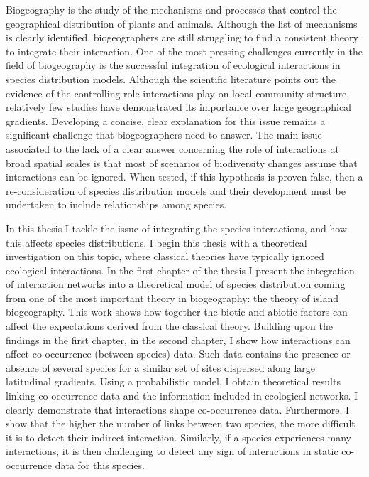 Biogeography is the study of the mechanisms and processes that control
the geographical distribution of plants and animals. Although the list
of mechanisms is clearly identified, biogeographers are still struggling
to find a consistent theory to integrate their interaction. One of the
most pressing challenges currently in the field of biogeography is the
successful integration of ecological interactions in species
distribution models. Although the scientific literature points out the
evidence of the controlling role interactions play on local community
structure, relatively few studies have demonstrated its importance over
large geographical gradients. Developing a concise, clear explanation
for this issue remains a significant challenge that biogeographers need
to answer. The main issue associated to the lack of a clear answer
concerning the role of interactions at broad spatial scales is that most
of scenarios of biodiversity changes assume that interactions can be
ignored. When tested, if this hypothesis is proven false, then a
re-consideration of species distribution models and their development
must be undertaken to include relationships among species.

In this thesis I tackle the issue of integrating the species
interactions, and how this affects species distributions. I begin this
thesis with a theoretical investigation on this topic, where classical
theories have typically ignored ecological interactions. In the first
chapter of the thesis I present the integration of interaction networks
into a theoretical model of species distribution coming from one of the
most important theory in biogeography: the theory of island
biogeography. This work shows how together the biotic and abiotic
factors can affect the expectations derived from the classical theory.
Building upon the findings in the first chapter, in the second chapter,
I show how interactions can affect co-occurrence (between species) data.
Such data contains the presence or absence of several species for a
similar set of sites dispersed along large latitudinal gradients. Using
a probabilistic model, I obtain theoretical results linking
co-occurrence data and the information included in ecological networks.
I clearly demonstrate that interactions shape co-occurrence data.
Furthermore, I show that the higher the number of links between two
species, the more difficult it is to detect their indirect interaction.
Similarly, if a species experiences many interactions, it is then
challenging to detect any sign of interactions in static co-occurrence
data for this species.

